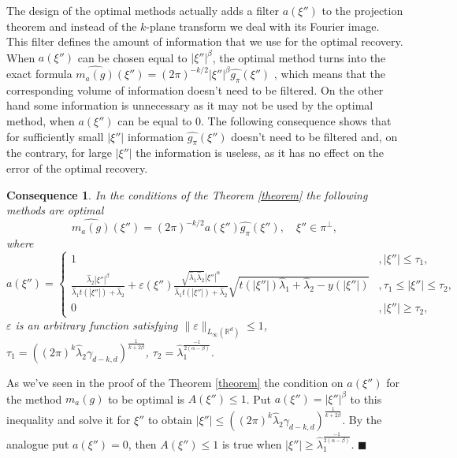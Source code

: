 \documentclass[12pt]{iopart}
\newtheorem{conseq}{Consequence}
\newenvironment{proof}
{\par\noindent{\bf Proof}}
{\hfill$\scriptstyle\blacksquare$}
\begin{document}
The design of the optimal methods actually adds a filter $a(\xi'')$ to the projection theorem and instead of the $k$-plane transform we deal with its Fourier image. This filter defines the amount of information that we use for the optimal recovery. When $a(\xi'')$ can be chosen equal to $|\xi''|^\beta$, the optimal method turns into the exact formula $\widehat{m_a(g)}(\xi'')=(2\pi)^{-k/2}|\xi''|^\beta\widehat{g_\pi }(\xi'')$ , which means that the corresponding volume of information doesn't need to be filtered. On the other hand some information is unnecessary as it may not be used by the optimal method, when $a(\xi'')$ can be equal to $0$. The following consequence shows that for sufficiently small  $|\xi''|$ information $\widehat{g_\pi}(\xi'')$ doesn't need to be filtered and, on the contrary, for large  $|\xi''|$ the information is useless, as it  has no effect on the error of the optimal recovery.

\begin{conseq}
\label{cons}
In the conditions of the Theorem \ref{theorem} the following methods are optimal $$
\widehat{m_a(g)}(\xi'')=(2\pi)^{-k/2}a(\xi'')\widehat{g_\pi }(\xi''),\quad \xi''\in\pi^\perp,$$ where
  \[
a(\xi'')=
  \begin{cases}
    1& ,|\xi''|\le \tau_1,\\
    \frac{\widehat\lambda_2|\xi''|^\beta}{\widehat\lambda_1t(|\xi''|)+\widehat\lambda_2}+\varepsilon(\xi'')\frac{\sqrt{\widehat\lambda_1\widehat\lambda_2}|\xi''|^\alpha}{\widehat\lambda_1t(|\xi''|)+\widehat\lambda_2}\sqrt{t(|\xi''|)\widehat\lambda_1+\widehat\lambda_2-y(|\xi''|)}& ,\tau_1 \le|\xi''|\le\tau_2,\\
    0 &,|\xi''|\ge\tau_2,
  \end{cases}
\]
$\varepsilon$ is an arbitrary function satisfying $\|\varepsilon\|_{L_\infty(\mathbb R^d)}\le 1$, $\tau_1=((2\pi)^k\widehat\lambda_2\gamma_{d-k,d})^\frac{1}{k+2\beta}$, $\tau_2=\widehat\lambda_1^{\frac{-1}{2(\alpha-\beta)}}.$
\end{conseq}

\begin{proof}
As we've seen in the proof of the Theorem \ref{theorem} the condition on $a(\xi'')$ for the method $m_a(g)$ to be optimal is $A(\xi'')\leqslant 1$. Put $a(\xi'')=|\xi''|^\beta$ to this inequality and solve it for $\xi''$ to obtain $|\xi''|\le ((2\pi)^k\widehat\lambda_2\gamma_{d-k,d})^\frac{1}{k+2\beta}$. By the analogue put $a(\xi'')=0$,
  then $A(\xi'')\leqslant 1$ is true when $|\xi''|\geqslant
  \widehat\lambda_1^{\frac{-1}{2(\alpha-\beta)}}$.
\end{proof}
\end{document}
